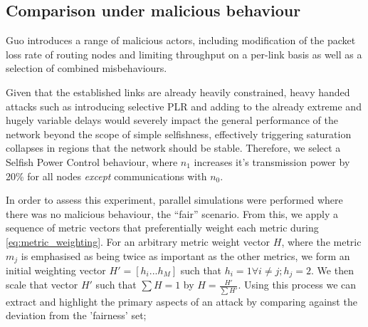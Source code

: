 \documentclass[conference]{IEEEtran}
\begin{document}
\subsection{Comparison under malicious behaviour}

Guo introduces a range of malicious actors, including modification of the packet loss rate of routing nodes and limiting throughput on a per-link basis as well as a selection of combined misbehaviours. 

Given that the established links are already heavily constrained, heavy handed attacks such as introducing selective PLR and adding to the already extreme and hugely variable delays would severely impact the general performance of the network beyond the scope of simple selfishness, effectively triggering saturation collapses in regions that the network should be stable.
Therefore, we select a Selfish Power Control behaviour, where $n_1$ increases it's transmission power by 20\% for all nodes \emph{except} communications with $n_0$.

In order to assess this experiment, parallel simulations were performed where there was no malicious behaviour, the ``fair'' scenario. 
From this, we apply a sequence of metric vectors that preferentially weight each metric during \eqref{eq:metric_weighting}.
For an arbitrary metric weight vector $H$, where the metric $m_j$ is emphasised as being twice as important as the other metrics, we form an initial weighting vector $H'=[h_i...h_M]$ such that $h_i = 1 \forall i \ne j; h_j=2$. We then scale that vector $H'$ such that $\sum H = 1$ by $H= \frac{H'}{\sum H'}$.
Using this process we can extract and highlight the primary aspects of an attack by comparing against the deviation from the 'fairness' set; 
\end{document}
